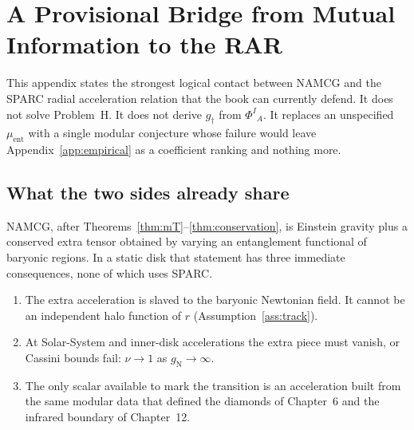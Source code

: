 \chapter{A Provisional Bridge from Mutual Information to the RAR}
\label{app:rar-bridge}

This appendix states the strongest logical contact between NAMCG
and the SPARC radial acceleration relation that the book can
currently defend. It does not solve Problem~H. It does not
derive \(g_\dagger\) from \(\Phi^I{}_A\). It replaces an
unspecified \(\mu_{\mathrm{ent}}\) with a single modular
conjecture whose failure would leave Appendix~\ref{app:empirical}
as a coefficient ranking and nothing more.

\section{What the two sides already share}
\label{sec:appE-share}

NAMCG, after Theorems~\ref{thm:mT}--\ref{thm:conservation}, is
Einstein gravity plus a conserved extra tensor obtained by
varying an entanglement functional of baryonic regions. In a
static disk that statement has three immediate consequences,
none of which uses SPARC.

\begin{enumerate}
  \item The extra acceleration is slaved to the baryonic
        Newtonian field. It cannot be an independent halo
        function of \(r\) (Assumption~\ref{ass:track}).
  \item At Solar-System and inner-disk accelerations the extra
        piece must vanish, or Cassini bounds fail:
        \(\nu\to 1\) as \(g_{\mathrm{N}}\to\infty\).
  \item The only scalar available to mark the transition is an
        acceleration built from the same modular data that
        defined the diamonds of Chapter~6 and the infrared
        boundary of Chapter~12.
\end{enumerate}


